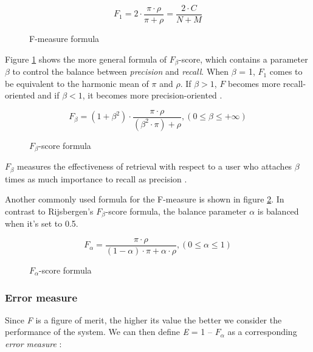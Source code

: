 \begin{figure}[H]
\begin{displaymath}
	F_1 = 2 \cdot \frac{\pi \cdot \rho}{\pi + \rho} = \frac{2 \cdot C}{N + M}
\end{displaymath}
\caption{F-measure formula}
\end{figure}

Figure \ref{fig:fbeta-score} shows the more general formula of $F_\beta$-score, which contains a parameter $\beta$ to control the balance between \textit{precision} and \textit{recall}. When $\beta$ = 1, $F_1$ comes to be equivalent to the harmonic mean of $\pi$ and $\rho$. If $\beta > 1$, $F$ becomes more recall-oriented and if $\beta < 1$, it becomes more precision-oriented \cite{Sasaki:2007}.

\begin{figure}[H]
\begin{displaymath}
	F_\beta = (1+\beta^2) \cdot \frac{\pi \cdot \rho}{(\beta^2 \cdot \pi) + \rho}, (0 \le \beta \le +\infty)
\end{displaymath}
\caption{$\textit{F}_\beta$-score formula \cite{Chinchor:1992}}
\label{fig:fbeta-score}
\end{figure}

$\textit{F}_\beta$ measures the effectiveness of retrieval with respect to a user who attaches $\beta$ times as much importance to recall as precision \cite{Rijsbergen:1979}.

Another commonly used formula for the F-measure is shown in figure \ref{fig:falpha-score}. In contrast to Rijsbergen's $F_\beta$-score formula, the balance parameter $\alpha$ is balanced when it's set to 0.5.

\begin{figure}[H]
\begin{displaymath}
	F_\alpha = \frac{\pi \cdot \rho}{(1-\alpha) \cdot \pi + \alpha \cdot \rho}, (0 \le \alpha \le 1)
\end{displaymath}
\caption{$\textit{F}_\alpha$-score formula \cite{Makhoul:1999}}
\label{fig:falpha-score}
\end{figure}

\subsubsection{Error measure}
Since \textit{F} is a figure of merit, the higher its value the better we consider the performance of the system. We can then define \textit{E} = 1 – $F_\alpha$ as a corresponding \textit{error measure} \cite{Makhoul:1999}:


